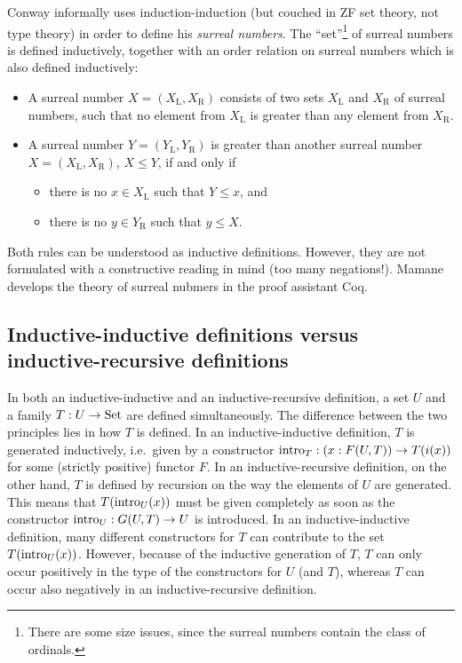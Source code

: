 \documentclass{article}
\begin{document}
\begin{example}
\label{ex:surreal}

Conway \cite{conway2001ONAG} informally uses induction-induction (but
couched in ZF set theory, not type theory) in order to define his
\emph{surreal numbers}. The ``set''\footnote{There are some size
  issues, since the surreal numbers contain the class of ordinals.} of
surreal numbers is defined inductively, together with an order
relation on surreal numbers which is also defined inductively:

\begin{itemize}
\item A surreal number $X = (X_\mathrm{L}, X_\mathrm{R})$ consists of
  two sets $X_\mathrm{L}$ and $X_\mathrm{R}$ of surreal numbers, such
  that no element from $X_\mathrm{L}$ is greater than any element from
  $X_\mathrm{R}$.
\item A surreal number $Y = (Y_\mathrm{L}, Y_\mathrm{R})$ is greater
  than another surreal number $X = (X_\mathrm{L}, X_\mathrm{R})$, $X \leq Y$, if and
  only if
  \begin{itemize}
  \item there is no $x \in X_\mathrm{L}$ such that $Y \leq x$, and
  \item there is no $y \in Y_\mathrm{R}$ such that $y \leq X$.
  \end{itemize}
\end{itemize}

Both rules can be understood as inductive definitions. However, they
are not formulated with a constructive reading in mind (too many
negations!). Mamane~\cite{mamane2004surrealCoq} develops the theory of
surreal nubmers in the proof assistant Coq. %
\blackqed
\end{example}


\subsection{Inductive-inductive definitions versus inductive-recursive definitions}
\label{sec:indind-vs-IR}


In both an inductive-inductive and an inductive-recursive definition,
a set $U$ and a family $T : U \to \text{Set}$ are defined
simultaneously. The difference between the two principles lies in how
$T$ is defined. In an inductive-inductive definition, $T$ is generated
inductively, i.e.\ given by a constructor $\text{intro}_{T} : (x : F(U, T))
\to T(i(x))$ for some (strictly positive) functor
$F$. %
In an inductive-recursive definition, on the other hand, $T$ is
defined by recursion on the way the elements of $U$ are
generated. This means that $T(\text{intro}_{U}(x))$ must be given completely
as soon as the constructor $\text{intro}_{U} : G(U, T) \to U$ is
introduced. In an inductive-inductive definition, many different
constructors for $T$ can contribute to the set $T(\text{intro}_{U}(x))$.
However, because of the inductive generation of $T$, $T$ can only
occur positively in the type of the constructors for $U$ (and $T$),
whereas $T$ can occur also negatively in an inductive-recursive
definition.
\end{document}

